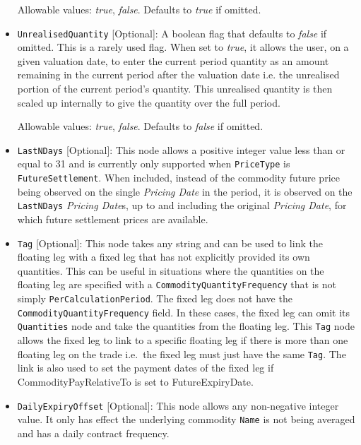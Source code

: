 \begin{itemize}
Allowable values: \emph{true}, \emph{false}. Defaults to \emph{true} if omitted.

\item
\lstinline!UnrealisedQuantity! [Optional]: A boolean flag that defaults to \emph{false} if omitted. This is a rarely used flag. When set to \emph{true}, it allows the user, on a given valuation date, to enter the current period quantity as an amount remaining in the current period after the valuation date i.e. the unrealised portion of the current period's quantity. This unrealised quantity is then scaled up internally to give the quantity over the full period.

Allowable values: \emph{true}, \emph{false}. Defaults to \emph{false} if omitted.

\item
\lstinline!LastNDays! [Optional]: This node allows a positive integer value less than or equal to 31 and is currently only supported when \lstinline!PriceType! is \lstinline!FutureSettlement!. When included, instead of the commodity future price being observed on the single \textit{Pricing Date} in the period, it is observed on the \lstinline!LastNDays! \textit{Pricing Date}s, up to and including the original \textit{Pricing Date}, for which future settlement prices are available.

\item
\lstinline!Tag! [Optional]: This node takes any string and can be used to link the floating leg with a fixed leg that has not explicitly provided its own quantities. This can be useful in situations where the quantities on the floating leg are specified with a \lstinline!CommodityQuantityFrequency! that is not simply \lstinline!PerCalculationPeriod!. The fixed leg does not have the \lstinline!CommodityQuantityFrequency! field. In these cases, the fixed leg can omit its \lstinline!Quantities! node and take the quantities from the floating leg. This \lstinline!Tag! node allows the fixed leg to link to a specific floating leg if there is more than one floating leg on the trade i.e.\ the fixed leg must just have the same \lstinline!Tag!. The link is also used to set the payment dates of the fixed leg if CommodityPayRelativeTo is set to FutureExpiryDate.

\item
\lstinline!DailyExpiryOffset! [Optional]: This node allows any non-negative integer value. It only has effect the
underlying commodity \lstinline!Name! is not being averaged and has a daily contract frequency.


\end{itemize}
